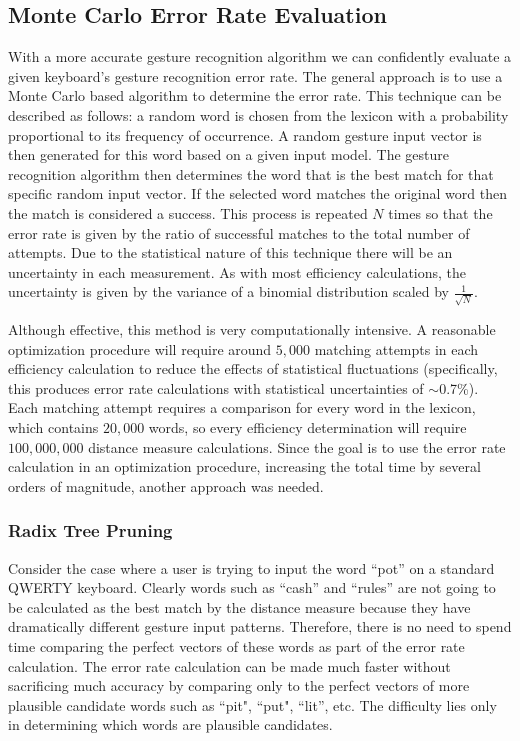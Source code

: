 \documentclass[final,1p,times,authoryear]{elsarticle}
\begin{document}
\subsection{Monte Carlo Error Rate Evaluation\label{sub:Error-Rate-Evaluation}}
With a more accurate gesture recognition algorithm we can confidently evaluate 
a given keyboard's gesture recognition error rate. The general approach is to use a Monte Carlo based algorithm to determine
the error rate. This technique can be described as follows: a random
word is chosen from the lexicon with a probability proportional
to its frequency of occurrence. A random gesture input vector is then
generated for this word based on a given input model. 
The gesture recognition algorithm then determines the word that is the
best match for that specific random input vector. If the selected word matches the original
word then the match is considered a success. This process is repeated
$N$ times so that the error rate is given by the ratio of successful
matches to the total number of attempts. Due to the statistical nature
of this technique there will be an uncertainty in each measurement.
As with most efficiency calculations, the uncertainty is given by
the variance of a binomial distribution scaled by $\frac{1}{\sqrt{N}}$.

Although effective, this method is very computationally intensive.
A reasonable optimization procedure will require around $5,000$ matching
attempts in each efficiency calculation to reduce the effects of statistical
fluctuations (specifically, this produces error rate calculations with statistical uncertainties of $\sim$0.7\%).
Each matching attempt requires a comparison for every
word in the lexicon, which contains $20,000$ words, so every efficiency
determination will require $100,000,000$ distance measure calculations.
Since the goal is to use the error rate calculation in an optimization
procedure, increasing the total time by several orders of magnitude,
another approach was needed.

\subsubsection{Radix Tree Pruning}
Consider the case where a user is trying to input the word ``pot''
on a standard QWERTY keyboard. Clearly words such as ``cash'' and
``rules'' are not going to be calculated as the best match by the
distance measure because they have dramatically different gesture input patterns.
Therefore, there is no need to spend time comparing the perfect vectors
of these words as part of the error rate calculation. The error rate
calculation can be made much faster without sacrificing much accuracy
by comparing only to the perfect vectors of more plausible candidate
words such as ``pit", ``put", ``lit'', etc. The difficulty lies only in determining which words
are plausible candidates.
\end{document}
